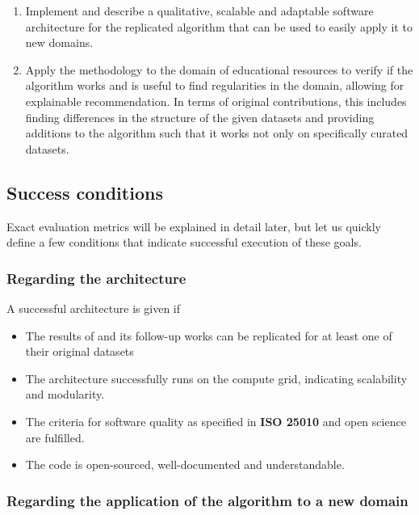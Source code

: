 \begin{enumerate}
    \item Implement and describe a qualitative, scalable and adaptable software architecture for the replicated algorithm that can be used to easily apply it to new domains.
    \item Apply the methodology to the domain of educational resources to verify if the algorithm works and is useful to find regularities in the domain, allowing for explainable recommendation. In terms of original contributions, this includes finding differences in the structure of the given datasets and providing additions to the algorithm such that it works not only on specifically curated datasets.
\end{enumerate}

\subsection{Success conditions}
\label{sec:success_conds}

Exact evaluation metrics will be explained in detail later, but let us quickly define a few conditions that indicate successful execution of these goals.

\subsubsection*{Regarding the architecture}

A successful architecture is given if 

\begin{itemize}
    \item The results of \cite{Derrac2015} and its follow-up works \cite{Ager2018,Alshaikh2020} can be replicated for at least one of their original datasets
    \item The architecture successfully runs on the compute grid, indicating scalability and modularity.
    \item The criteria for software quality as specified in \textbf{ISO 25010} and open science are fulfilled.
    \item The code is open-sourced, well-documented and understandable.
\end{itemize}

\subsubsection*{Regarding the application of the algorithm to a new domain}

